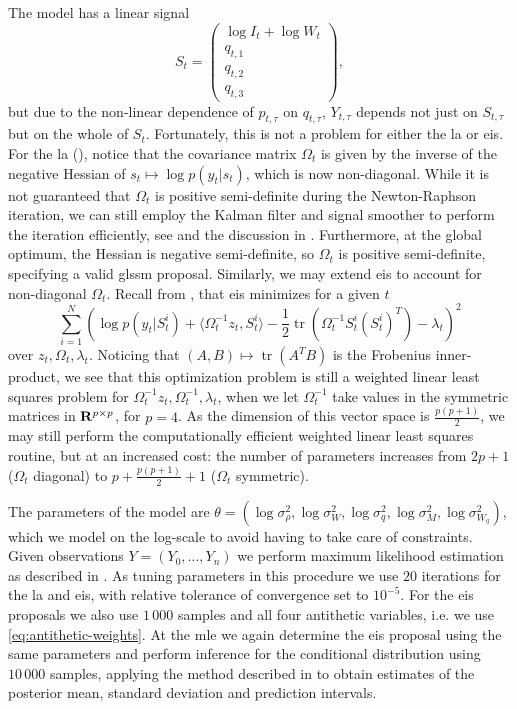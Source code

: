 The model has a linear signal 
$$
    S_{t} = \begin{pmatrix}
        \log I_{t} + \log W_{t} \\
        q_{t, 1} \\
        q_{t, 2} \\
        q_{t, 3} 
    \end{pmatrix},
$$
but due to the non-linear dependence of $p_{t,\tau}$ on $q_{t,\tau}$,  $Y_{t,\tau}$ depends not just on $S_{t, \tau}$ but on the whole of $S_{t}$. Fortunately, this is not a problem for either the \gls{la} or \gls{eis}. For the \gls{la} (), notice that the covariance matrix $\Omega_{t}$ is given by the inverse of the negative Hessian of $s_{t} \mapsto \log p(y_{t}|s_{t})$, which is now non-diagonal. While it is not guaranteed that $\Omega_{t}$ is positive semi-definite during the Newton-Raphson iteration, we can still employ the Kalman filter and signal smoother to perform the iteration efficiently, see \citep{Jungbacker2007Monte} and the discussion in . Furthermore, at the global optimum, the Hessian is negative semi-definite, so $\Omega_{t}$ is positive semi-definite, specifying a valid \gls{glssm} proposal. 
Similarly, we may extend \gls{eis} to account for non-diagonal $\Omega_{t}$. Recall from , that \gls{eis} minimizes for a given $t$ 
$$
    \sum_{i = 1}^N \left( \log p(y_{t} | S^{i}_t) + \langle \Omega_{t}^{-1}z_{t}, S^{i}_{t}\rangle - \frac{1}{2} \operatorname{tr} \left(\Omega^{-1}_{t}S^{i}_{t}(S^{i}_t)^{T}\right)- \lambda_{t} \right)^{2}
$$
over $z_{t}, \Omega_{t}, \lambda_{t}$. Noticing that $(A,B) \mapsto \operatorname{tr} \left( A^{T}B \right)$ is the Frobenius inner-product, we see that this optimization problem is still a weighted linear least squares problem for $\Omega_{t}^{-1}z_{t}, \Omega^{-1}_t, \lambda_{t}$, when we let $\Omega_{t}^{-1}$ take values in the symmetric matrices in $\mathbf R^{p \times p}$, for $p=4$. As the dimension of this vector space is $ \frac{p (p + 1)}{2}$, we may still perform the computationally efficient weighted linear least squares routine, but at an increased cost: the number of parameters increases from $2p + 1$ ($\Omega_{t}$ diagonal) to $p + \frac{p(p + 1)}{2} + 1$ ($\Omega_{t}$ symmetric). 

The parameters of the model are $\theta = \left( \log \sigma^{2}_{\rho}, \log \sigma^{2}_{W}, \log \sigma^{2}_{q}, \log \sigma^{2}_M, \log \sigma^{2}_{W_{q}}\right)$, which we model on the log-scale to avoid having to take care of constraints. Given observations $Y = (Y_{0}, \dots, Y_{n})$ we perform maximum likelihood estimation as described in . As tuning parameters in this procedure we use $20$ iterations for the \gls{la} and \gls{eis}, with relative tolerance of convergence set to $10^{-5}$. For the \gls{eis} proposals we also use $1\,000$ samples and all four antithetic variables, i.e. we use \eqref{eq:antithetic-weights}. At the \gls{mle} we again determine the \gls{eis} proposal using the same parameters and perform inference for the conditional distribution using $10\,000$ samples, applying the method described in  to obtain estimates of the posterior mean, standard deviation and prediction intervals. 

